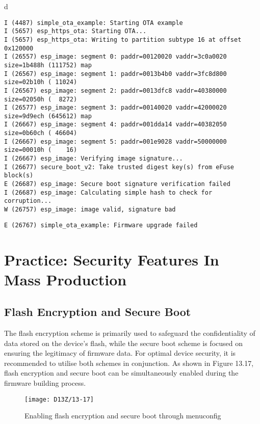 \documentclass[a4paper,12pt]{book}
\begin{document}
\begin{codebloc}
\begin{tabular}{d}
\fontsize{9pt}{10pt}\selectfont
\vspace{2pt}
\begin{verbatim}
I (4487) simple_ota_example: Starting OTA example
I (5657) esp_https_ota: Starting OTA...
I (5657) esp_https_ota: Writing to partition subtype 16 at offset 0x120000
I (26557) esp_image: segment 0: paddr=00120020 vaddr=3c0a0020 size=1b488h (111752) map
I (26567) esp_image: segment 1: paddr=0013b4b0 vaddr=3fc8d800 size=02b10h ( 11024) 
I (26567) esp_image: segment 2: paddr=0013dfc8 vaddr=40380000 size=02050h (  8272) 
I (26577) esp_image: segment 3: paddr=00140020 vaddr=42000020 size=9d9ech (645612) map
I (26667) esp_image: segment 4: paddr=001dda14 vaddr=40382050 size=0b60ch ( 46604) 
I (26667) esp_image: segment 5: paddr=001e9028 vaddr=50000000 size=00010h (    16) 
I (26667) esp_image: Verifying image signature...
I (26677) secure_boot_v2: Take trusted digest key(s) from eFuse block(s)
E (26687) esp_image: Secure boot signature verification failed
I (26687) esp_image: Calculating simple hash to check for corruption...
W (26757) esp_image: image valid, signature bad
\end{verbatim}
\verb|E (26767) simple_ota_example: Firmware upgrade failed|
\end{tabular}
\end{codebloc}

\section{Practice: Security Features In Mass Production}
\subsection{Flash Encryption and Secure Boot}
The flash encryption scheme is primarily used to safeguard the confidentiality of data stored on the device’s flash, while the secure boot scheme is focused on ensuring the legitimacy of firmware data. For optimal device security, it is recommended to utilise both schemes in conjunction. As shown in Figure 13.17, flash encryption and secure boot can be simultaneously enabled during the firmware building process.

\begin{figure}[!h]
    \centering
    \texttt{[image: D13Z/13-17]}
    \caption{Enabling flash encryption and secure boot through menuconfig}
\end{figure}
\end{document}
